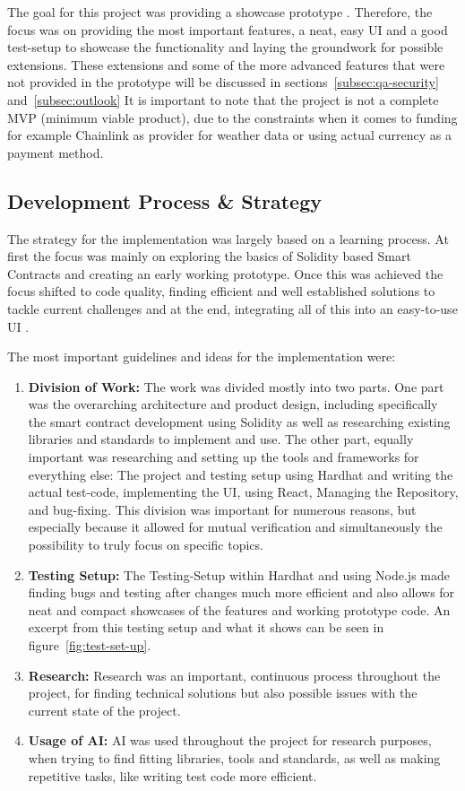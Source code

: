 \documentclass[11pt,a4paper]{article}
\begin{document}
	The goal for this project was providing a showcase prototype .
	Therefore, the focus was on providing the most important features, a neat, easy UI and a good test-setup to showcase the functionality and laying the groundwork for possible extensions.
	These extensions and some of the more advanced features that were not provided in the prototype will be discussed in sections~\ref{subsec:qa-security} and~\ref{subsec:outlook}
	It is important to note that the project is not a complete MVP (minimum viable product), due to the constraints when it comes to funding for example Chainlink as provider for weather data or using actual currency as a payment method.

	\subsection{Development Process \& Strategy}\label{subsec:dev-strategy}
	The strategy for the implementation was largely based on a learning process.
	At first the focus was mainly on exploring the basics of Solidity based Smart Contracts and creating an early working prototype.
	Once this was achieved the focus shifted to code quality, finding efficient and well established solutions to tackle current challenges and at the end, integrating all of this into an easy-to-use UI .


	The most important guidelines and ideas for the implementation were:

	\begin{enumerate}[1]
		\item \textbf{Division of Work:} The work was divided mostly into two parts.
			One part was the overarching architecture and product design, including specifically the smart contract development using Solidity as well as researching existing libraries and standards to implement and use.
			The other part, equally important was researching and setting up the tools and frameworks for everything else: The project and testing setup using Hardhat and writing the actual test-code, implementing the UI, using React, Managing the Repository, and bug-fixing.
			This division was important for numerous reasons, but especially because it allowed for mutual verification and simultaneously the possibility to truly focus on specific topics.
		\item \textbf{Testing Setup:} The Testing-Setup within Hardhat and using Node.js made finding bugs and testing after changes much more efficient and also allows for neat and compact showcases of the features and working prototype code.
			An excerpt from this testing setup and what it shows can be seen in figure~\ref{fig:test-set-up}.
		\item \textbf{Research:} Research was an important, continuous process throughout the project, for finding technical solutions but also possible issues with the current state of the project.
		\item \textbf{Usage of AI:} AI was used throughout the project for research purposes, when trying to find fitting libraries, tools and standards, as well as making repetitive tasks, like writing test code more efficient.
	\end{enumerate}
\end{document}
